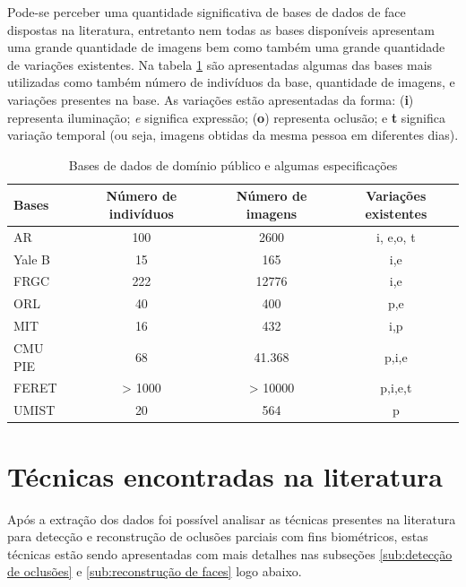 Pode-se perceber uma quantidade significativa de bases de dados de face dispostas na literatura, entretanto nem todas as bases disponíveis apresentam uma grande quantidade de imagens bem como também uma grande quantidade de variações existentes. Na tabela \ref{tab:variacoes_bases} são apresentadas algumas das bases mais utilizadas como também número de indivíduos da base, quantidade de imagens, e variações presentes na base. As variações estão apresentadas da forma: (\textbf{i}) representa iluminação; \textit{e} significa expressão; (\textbf{o}) representa oclusão; e \textbf{t} significa variação temporal (ou seja, imagens obtidas da mesma pessoa em diferentes dias).

\begin{table}[H]
	
\centering
\footnotesize
\caption{Bases de dados de domínio público e algumas especificações}
\label{tab:variacoes_bases}

\begin{tabular}{|l|c|c|c|} \hline

\textbf{Bases}& \textbf{Número de indivíduos} & \textbf{Número de imagens} & \textbf{Variações existentes}\\ \hline
      					
AR			&	 100 	& 2600 		& i, e,o, t \\ \hline
Yale B	 	&	15 		& 165 		& i,e\\ \hline
FRGC  		&	222 	& 12776 	& i,e \\ \hline
ORL 		&	40 		& 400 		& p,e\\ \hline
MIT 		&	16 		& 432		& i,p\\ \hline
CMU PIE 	&	68		&41.368 	& p,i,e\\ \hline
FERET		& > 1000 	& > 10000 	& p,i,e,t\\ \hline 
UMIST		& 20		& 564		& p \\ \hline 

		
	\end{tabular}
    
\end{table}


\section{Técnicas encontradas na literatura}

Após a extração dos dados foi possível analisar as técnicas presentes na literatura para detecção e reconstrução de oclusões parciais com fins biométricos, estas técnicas estão sendo apresentadas com mais detalhes nas subseções \ref{sub:detecção de oclusões} e \ref{sub:reconstrução de faces} logo abaixo.

